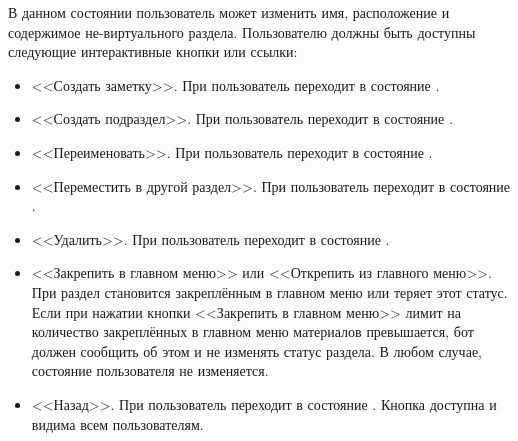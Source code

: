 \begin{enumerate}
                В данном состоянии пользователь может изменить имя, расположение и содержимое не-виртуального
                раздела.
                Пользователю должны быть доступны следующие интерактивные кнопки или ссылки:
                \begin{itemize}
                    \item
                        <<Создать заметку>>.
                        При  пользователь переходит в состояние
                        \hyperref[itm:req:ui:states:create-note]
                        {}.
                    \item
                        <<Создать подраздел>>.
                        При  пользователь переходит в состояние
                        \hyperref[itm:req:ui:states:create-section]
                        {}.
                    \item
                        <<Переименовать>>.
                        При  пользователь переходит в состояние
                        \hyperref[itm:req:ui:states:rename-kbo]
                        {}.
                    \item
                        <<Переместить в другой раздел>>.
                        При  пользователь переходит в состояние
                        \hyperref[itm:req:ui:states:move-kbo]
                        {}.
                    \item
                        <<Удалить>>.
                        При  пользователь переходит в состояние
                        \hyperref[itm:req:ui:states:delete-kbo]
                        {}.
                    \item
                        <<Закрепить в главном меню>> или <<Открепить из главного меню>>.
                        При  раздел становится закреплённым в главном меню или теряет этот
                        статус. Если при нажатии кнопки <<Закрепить в главном меню>> лимит на количество
                        закреплённых в главном меню материалов превышается, бот должен сообщить об
                        этом и не изменять статус раздела. В любом случае, состояние пользователя
                        не изменяется.
                    \item
                        <<Назад>>.
                        При  пользователь переходит в состояние
                        \hyperref[itm:req:ui:states:navx]
                        {}.
                        Кнопка доступна и видима всем пользователям.
                \end{itemize}


\end{enumerate}

